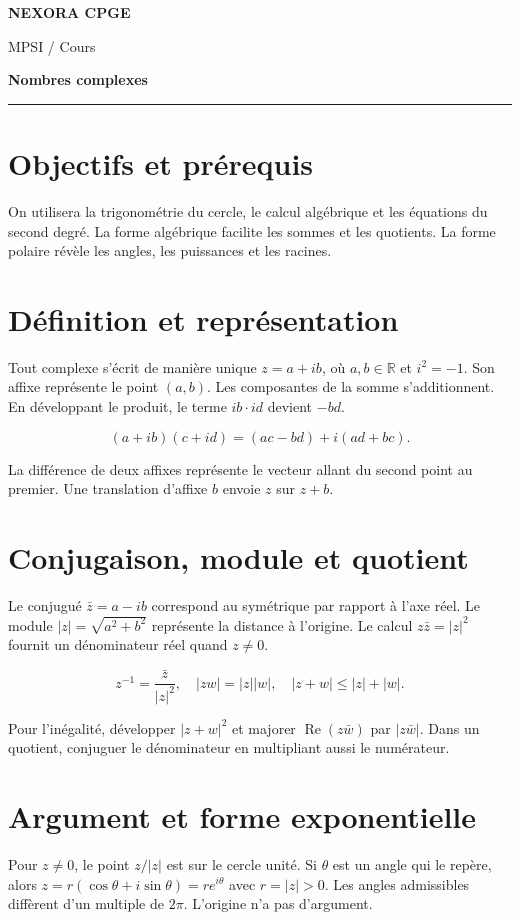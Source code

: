 \documentclass[11pt,a4paper]{article}
\begin{document}
{\small\bfseries\color{nexorablue} NEXORA CPGE}\par
{\small MPSI / Cours}\par
{\LARGE\bfseries Nombres complexes}\par
\vspace{0.25em}\hrule\vspace{0.6em}

\section*{Objectifs et prérequis}
On utilisera la trigonométrie du cercle, le calcul algébrique et les équations du second degré. La forme algébrique facilite les sommes et les quotients. La forme polaire révèle les angles, les puissances et les racines.

\section*{Définition et représentation}
Tout complexe s’écrit de manière unique $z=a+ib$, où $a,b\in\mathbb R$ et $i^2=-1$. Son affixe représente le point $(a,b)$. Les composantes de la somme s’additionnent. En développant le produit, le terme $ib\cdot id$ devient $-bd$.

\[ (a+ib)(c+id)=(ac-bd)+i(ad+bc). \]

La différence de deux affixes représente le vecteur allant du second point au premier. Une translation d’affixe $b$ envoie $z$ sur $z+b$.

\section*{Conjugaison, module et quotient}
Le conjugué $\bar z=a-ib$ correspond au symétrique par rapport à l’axe réel. Le module $|z|=\sqrt{a^2+b^2}$ représente la distance à l’origine. Le calcul $z\bar z=|z|^2$ fournit un dénominateur réel quand $z\ne0$.

\[ z^{-1}=\frac{\bar z}{|z|^2},\quad |zw|=|z||w|,\quad |z+w|\le |z|+|w|. \]

Pour l’inégalité, développer $|z+w|^2$ et majorer $\operatorname{Re}(z\bar w)$ par $|z\bar w|$. Dans un quotient, conjuguer le dénominateur en multipliant aussi le numérateur.

\section*{Argument et forme exponentielle}
Pour $z\ne0$, le point $z/|z|$ est sur le cercle unité. Si $\theta$ est un angle qui le repère, alors $z=r(\cos\theta+i\sin\theta)=re^{i\theta}$ avec $r=|z|>0$. Les angles admissibles diffèrent d’un multiple de $2\pi$. L’origine n’a pas d’argument.
\end{document}
